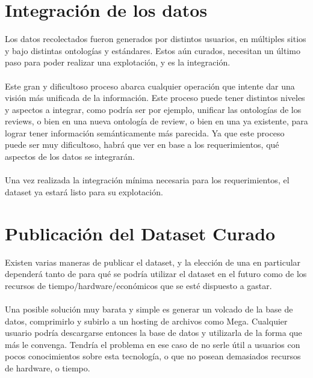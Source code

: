 %

\section{Integración de los datos}
\label{section:integracion}

Los datos recolectados fueron generados por distintos usuarios, en múltiples sitios y bajo distintas ontologías y estándares.
Estos aún curados, necesitan un último paso para poder realizar una explotación, y es la integración.
\\\\
Este gran y dificultoso proceso abarca cualquier operación que intente dar una visión más unificada de la información. Este
proceso puede tener distintos niveles y aspectos a integrar, como podría ser por ejemplo, unificar las ontologías de los reviews, o bien
en una nueva ontología de review, o bien en una ya existente, para lograr tener información semánticamente más parecida. Ya 
que este proceso puede ser muy dificultoso, habrá que ver en base a los requerimientos, qué aspectos de los datos se integrarán.
\\\\
Una vez realizada la integración mínima necesaria para los requerimientos, el dataset ya estará listo para su explotación.

\section{Publicación del Dataset Curado}

Existen varias maneras de publicar el dataset, y la elección de una en particular dependerá tanto de para qué se podría utilizar el dataset en el futuro como
de los recursos de tiempo/hardware/económicos que se esté dispuesto a gastar.
\\\\
Una posible solución muy barata y simple es generar un volcado de la base de datos, comprimirlo y subirlo a un hosting de archivos como Mega. Cualquier usuario podría descargarse entonces la base de datos y utilizarla de la forma que más le convenga.
Tendría el problema en ese caso de no serle útil a usuarios con pocos conocimientos sobre esta tecnología, o que no posean demasiados recursos de hardware, o tiempo.

